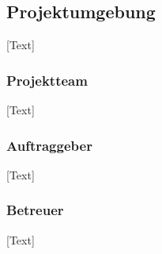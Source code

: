 \subsection{Projektumgebung}
[Text]

\subsubsection{Projektteam}
[Text]

\subsubsection{Auftraggeber}
[Text]

\subsubsection{Betreuer}
[Text]
